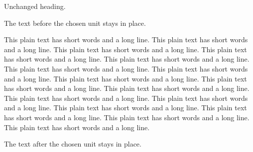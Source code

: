 \documentclass[11pt]{article}
\begin{document}
Unchanged heading.

The text before the chosen unit stays in place.

This plain text has short words and a long line. This plain text has short words and a long line. This plain text has short words and a long line. This plain text has short words and a long line. This plain text has short words and a long line. This plain text has short words and a long line. This plain text has short words and a long line. This plain text has short words and a long line. This plain text has short words and a long line. This plain text has short words and a long line. This plain text has short words and a long line. This plain text has short words and a long line. This plain text has short words and a long line. This plain text has short words and a long line. This plain text has short words and a long line. This plain text has short words and a long line.


\par\vspace{25mm}
The text after the chosen unit stays in place.
\end{document}
